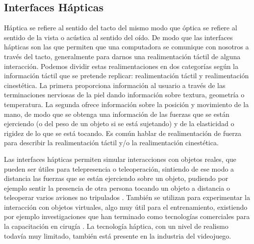 




\subsection{Interfaces Hápticas}
Háptica se refiere al sentido del tacto del mismo modo que óptica se refiere al sentido de la vista o acústica al sentido del oído. De modo que las interfaces hápticas son las que permiten que una computadora se comunique con nosotros a través del tacto, generalmente para darnos una realimentación táctil de alguna interacción. Podemos dividir estas realimentaciones en dos categorías según la información táctil que se pretende replicar: realimentación táctil y realimentación cinestética. La primera proporciona información al usuario a través de las terminaciones nerviosas de la piel dando información sobre textura, geometría o temperatura. La segunda ofrece información sobre la posición y movimiento de la mano, de modo que se obtenga una información de las fuerzas que se están ejerciendo (o del peso de un objeto si se está sujetando) y de la elasticidad o rigidez de lo que se está tocando. Es común hablar de realimentación de fuerza para describir la realimentación táctil y/o la realimentación cinestética.

Las interfaces hápticas permiten simular interacciones con objetos reales, que pueden ser útiles para telepresencia  o teleoperación, sintiendo de ese modo a distancia las fuerzas que se están ejerciendo sobre un objeto, pudiendo por ejemplo sentir la presencia de otra persona tocando un objeto a distancia o teleoperar varios aviones no tripulados \cite{troy2011systems,stigter2007design}. También se utilizan para experimentar la interacción con objetos virtuales, algo muy útil para el entrenamiento, existiendo por ejemplo investigaciones que han terminado como tecnologías comerciales para la capacitación en cirugía \cite{sun}. La tecnología háptica, con un nivel de realismo todavía muy limitado, también está presente en la industria del videojuego.

